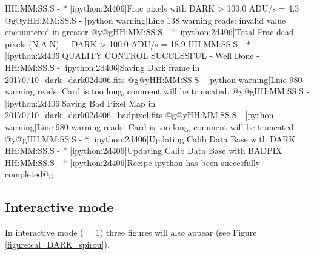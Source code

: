 \begin{cmdboxprintspecial}[fontupper=\tiny]
HH:MM:SS.S - * |ipython:2d406|Frac pixels with DARK > 100.0 ADU/s = 4.3 %
@g@yHH:MM:SS.S - \@ |python warning|Line 138 warning reads: invalid value encountered in greater
@y@gHH:MM:SS.S - * |ipython:2d406|Total Frac dead pixels (N.A.N) + DARK > 100.0 ADU/s = 18.9 %
HH:MM:SS.S - * |ipython:2d406|QUALITY CONTROL SUCCESSFUL - Well Done -
HH:MM:SS.S -   |ipython:2d406|Saving Dark frame in 20170710_dark_dark02d406.fits
@g@yHH:MM:SS.S - \@ |python warning|Line 980 warning reads: Card is too long, comment will be truncated.
@y@gHH:MM:SS.S -   |ipython:2d406|Saving Bad Pixel Map in 20170710_dark_dark02d406_badpixel.fits
@g@yHH:MM:SS.S - \@ |python warning|Line 980 warning reads: Card is too long, comment will be truncated.
@y@gHH:MM:SS.S - * |ipython:2d406|Updating Calib Data Base with DARK
HH:MM:SS.S - * |ipython:2d406|Updating Calib Data Base with BADPIX
HH:MM:SS.S - * |ipython:2d406|Recipe ipython has been succesfully completed@g
\end{cmdboxprintspecial}


\newpage
\subsection{Interactive mode}


\noindent In interactive mode ( = 1) three figures will also appear (see Figure \ref{figure:cal_DARK_spirou}).


